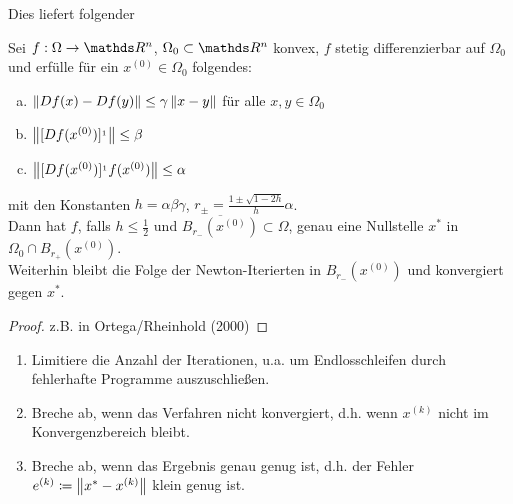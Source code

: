 Dies liefert folgender
\begin{satz}
	Sei $f:\Omega\rightarrow \Ren$, $\Omega_0 \subset \Ren$ konvex,
	$f$ stetig differenzierbar auf $\Omega_0$ und 
	erfülle für ein $x^{(0)}\in \Omega_0$ folgendes:
	\begin{enumerate}[a)]
		\item $\left\| Df(x) -Df(y) \right\|\leq \gamma \left\| x-y \right\|$ für alle $x,y\in \Omega_0$
		\item $\left\| [Df(x^{(0)})]^{_1} \right\| \leq \beta$
		\item $\left\| [Df(x^{(0)})]^{_1}f(x^{(0)}) \right\| \leq \alpha$
	\end{enumerate}
	mit den Konstanten $h=\alpha\beta\gamma$, $r_\pm = \frac{1\pm \sqrt{1-2h}}{h}\alpha$.\\
	Dann hat $f$, falls $h\leq \frac{1}{2}$ und $\overline{B_{r_{-}}(x^{(0)})}\subset \Omega$,
	genau eine Nullstelle $x^{*}$ in $\Omega_0\cap B_{r_+}(x^{(0)})$.\\
	Weiterhin bleibt die Folge der Newton-Iterierten in $B_{r_{-}}(x^{(0)})$
	und konvergiert gegen $x^{*}$.
	\begin{proof}
		z.B. in Ortega/Rheinhold (2000)
	\end{proof}
\end{satz}


\begin{enumerate}[1)]
	\item Limitiere die Anzahl der Iterationen, u.a. um 
	Endlosschleifen durch fehlerhafte Programme auszuschließen.
	\item Breche ab, wenn das Verfahren nicht konvergiert, d.h.
	wenn $x^{(k)}$ nicht im Konvergenzbereich bleibt.
	\item Breche ab, wenn das Ergebnis genau genug ist, d.h. der
	Fehler $e^{(k)}\coloneqq \left\| x^{*}-x^{(k)} \right\|$ klein genug ist.
\end{enumerate}


